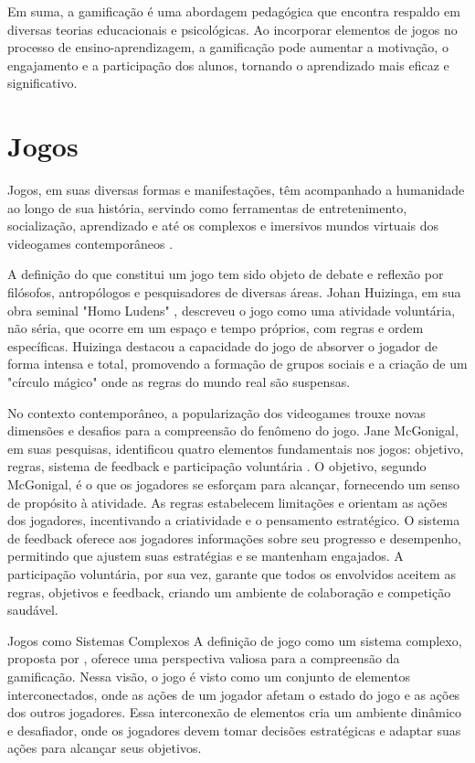 Em suma, a gamificação é uma abordagem pedagógica que encontra respaldo em diversas teorias educacionais e psicológicas. Ao incorporar elementos de jogos no processo de ensino-aprendizagem, a gamificação pode aumentar a motivação, o engajamento e a participação dos alunos, tornando o aprendizado mais eficaz e significativo.

\section{Jogos}

Jogos, em suas diversas formas e manifestações, têm acompanhado a humanidade ao longo de sua história, servindo como ferramentas de entretenimento, socialização, aprendizado e até os complexos e imersivos mundos virtuais dos videogames contemporâneos \cite{fardo2013gamificaccao}.

A definição do que constitui um jogo tem sido objeto de debate e reflexão por filósofos, antropólogos e pesquisadores de diversas áreas. Johan Huizinga, em sua obra seminal "Homo Ludens" \cite{huizinga1999homo}, descreveu o jogo como uma atividade voluntária, não séria, que ocorre em um espaço e tempo próprios, com regras e ordem específicas. Huizinga destacou a capacidade do jogo de absorver o jogador de forma intensa e total, promovendo a formação de grupos sociais e a criação de um "círculo mágico" onde as regras do mundo real são suspensas.

No contexto contemporâneo, a popularização dos videogames trouxe novas dimensões e desafios para a compreensão do fenômeno do jogo. Jane McGonigal, em suas pesquisas, identificou quatro elementos fundamentais nos jogos: objetivo, regras, sistema de feedback e participação voluntária \cite{mcgonigal2011reality}. O objetivo, segundo McGonigal, é o que os jogadores se esforçam para alcançar, fornecendo um senso de propósito à atividade. As regras estabelecem limitações e orientam as ações dos jogadores, incentivando a criatividade e o pensamento estratégico. O sistema de feedback oferece aos jogadores informações sobre seu progresso e desempenho, permitindo que ajustem suas estratégias e se mantenham engajados. A participação voluntária, por sua vez, garante que todos os envolvidos aceitem as regras, objetivos e feedback, criando um ambiente de colaboração e competição saudável.

Jogos como Sistemas Complexos
A definição de jogo como um sistema complexo, proposta por \cite{salen2004rules}, oferece uma perspectiva valiosa para a compreensão da gamificação. Nessa visão, o jogo é visto como um conjunto de elementos interconectados, onde as ações de um jogador afetam o estado do jogo e as ações dos outros jogadores. Essa interconexão de elementos cria um ambiente dinâmico e desafiador, onde os jogadores devem tomar decisões estratégicas e adaptar suas ações para alcançar seus objetivos.

